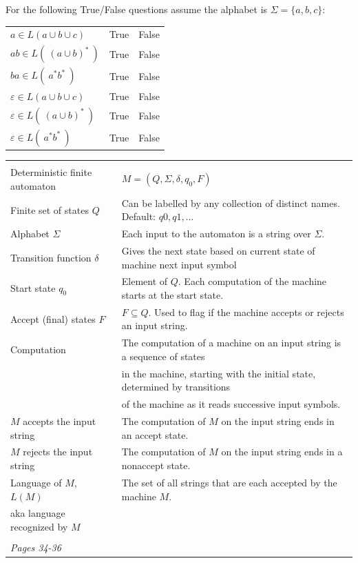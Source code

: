     
    For the following True/False questions assume the alphabet is $\Sigma =  \{a,b,c\}$:
    
    \begin{center}
    \begin{tabular}{lcc}
    $a  \in L(a \cup b \cup c)$ & True & False \\
    $ab  \in L(~ (a \cup b)^*  ~)$ & True & False \\
    $ba \in L( ~ a^* b^* ~)$ & True & False \\
    $\varepsilon  \in L(a \cup b \cup c)$ & True & False \\
    $\varepsilon  \in L(~ (a \cup b)^*  ~)$ & True & False \\
    $\varepsilon \in L( ~ a^* b^* ~)$ & True & False \\
    \end{tabular}
    \end{center}
    
    
    
    \begin{center}
    \begin{tabular}{|ll|}
    \hline
    & \\
    Deterministic finite automaton & $M = (Q, \Sigma, \delta, q_0, F)$ \\
    Finite set of states $Q$  & Can  be labelled by any collection  of distinct names. Default: $q0, q1, \ldots$  \\
    Alphabet $\Sigma$ &   Each input to the automaton is a string over  $\Sigma$. \\
    Transition function $\delta$ &  Gives the next state based on current state of machine next input symbol\\
    Start state $q_0$ & Element of $Q$.  Each computation of the machine starts at the  start  state.\\
    Accept (final) states $F$ & $F \subseteq  Q$. Used to flag if the machine accepts or rejects
    an input string.\\
    Computation & The computation of a machine on an input string is a sequence of states \\
    &  in the machine,  starting with the initial state, determined by transitions \\
    & of the machine as it reads successive input symbols.
    \\
    $M$ accepts the input string & The computation of $M$ on the input string ends in an
    accept state.\\
    $M$ rejects the input string & The computation of $M$ on the input string ends in a
    nonaccept state.\\
    Language of $M$, $L(M)$ & The set of  all strings that  are each accepted by the machine $M$.\\
    aka language recognized by $M$ & \\
    & \\
    \hline
    {\it Pages 34-36}& \\
    \hline
    \end{tabular}
    \end{center}
    
